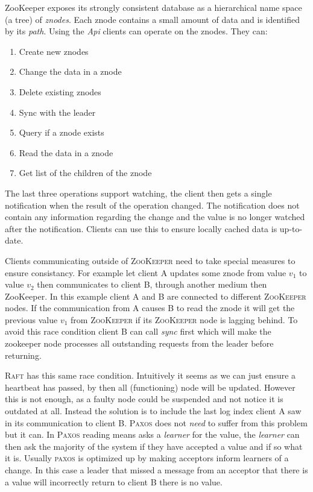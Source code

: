 ZooKeeper exposes its strongly consistent database as a hierarchical name space (a tree) of \textit{znodes}. Each {znode} contains a small amount of data and is identified by its \textit{path}. Using the \textit{Api} clients can operate on the znodes. They can: 
%
\begin{multicols}{2}
\begin{enumerate}
	\item Create new znodes
	\item Change the data in a znode
	\item Delete existing znodes
	\item Sync with the leader
	\item Query if a znode exists
	\item Read the data in a znode
	\item Get list of the children of the znode
\end{enumerate}
\end{multicols}
%
The last three operations support watching, the client then gets a single notification when the result of the operation changed. The notification does not contain any information regarding the change and the value is no longer watched after the notification. Clients can use this to ensure locally cached data is up-to-date. 

Clients communicating outside of \textsc{ZooKeeper} need to take special measures to ensure consistancy. For example let client A updates some znode from value $v_1$ to value $v_2$ then communicates to client B, through another medium then ZooKeeper. In this example client A and B are connected to different \textsc{ZooKeeper} nodes. If the communication from A causes B to read the znode it will get the previous value $v_1$ from \textsc{ZooKeeper} if its \textsc{ZooKeeper} node is lagging behind. To avoid this race condition client B can call \textit{sync} first which will make the zookeeper node processes all outstanding requests from the leader before returning.

\textsc{Raft} has this same race condition. Intuitively it seems as we can just ensure a heartbeat has passed, by then all (functioning) node will be updated. However this is not enough, as a faulty node could be suspended and not notice it is outdated at all. Instead the solution is to include the last log index client A saw in its communication to client B. \textsc{Paxos} does not \textit{need} to suffer from this problem but it can. In \textsc{Paxos} reading means asks a \textit{learner} for the value, the \textit{learner} can then ask the majority of the system if they have accepted a value and if so what it is. Usually \textsc{paxos} is optimized up by making acceptors inform learners of a change. In this case a leader that missed a message from an acceptor that there is a value will incorrectly return to client B there is no value.
